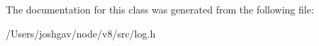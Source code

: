 The documentation for this class was generated from the following file\+:\begin{DoxyCompactItemize}
\item 
/\+Users/joshgav/node/v8/src/log.\+h\end{DoxyCompactItemize}
